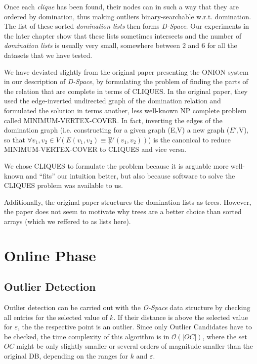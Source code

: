 \documentclass[runningheads]{llncs}
\begin{document}
Once each \emph{clique} has been found, their nodes can in such a way that they are ordered by domination, thus making outliers binary-searchable w.r.t. domination. The list of these sorted \emph{domination lists} then forms \emph{D-Space}. Our experiments in the later chapter show that these lists sometimes intersects and the number of \emph{domination lists} is usually very small, somewhere between 2 and 6 for all the datasets that we have tested.

We have deviated slightly from the original paper presenting the ONION system\cite{onion} in our description of \emph{D-Space}, by formulating the problem of finding the parts of the relation that are complete in terms of CLIQUES. In the original paper, they used the edge-inverted undirected graph of the domination relation and formulated the solution in terms another, less well-known NP complete problem called MINIMUM-VERTEX-COVER. In fact, inverting the edges of the domination graph (i.e. constructing for a given graph (E,V) a new graph ($E'$,V), so that $\forall v_1,v_2\in V(E(v_1,v_2) \equiv \not E'(v_1,v_2))$) is the canonical\cite{cormen} to reduce MINIMUM-VERTEX-COVER to CLIQUES and vice versa.

We chose CLIQUES to formulate the problem because it is arguable more well-known  and ``fits'' our intuition better, but also because software to solve the CLIQUES problem was available to us.

Additionally, the original paper structures the domination lists as trees. However, the paper does not seem to motivate why trees are a better choice than sorted arrays (which we reffered to as lists here).

\section{Online Phase}
\subsection{Outlier Detection}

Outlier detection can be carried out with the \emph{O-Space} data structure by checking all entries for the selected value of $k$. If their distance is above the selected value for $\varepsilon$, the the respective point is an outlier. Since only Outlier Candidates have to be checked, the time complexity of this algorithm is in $\mathcal{O}(|OC|)$, where the set $OC$ might be only slightly smaller or several orders of magnitude smaller than the original DB, depending on the ranges for $k$ and $\varepsilon$.
\end{document}
